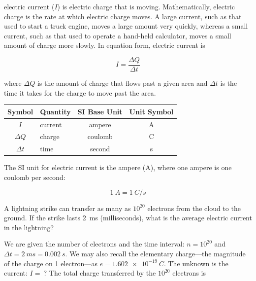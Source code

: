 \documentclass[dvipsnames]{article}
\numberwithin{equation}{section}
\numberwithin{figure}{section}
\begin{document}
\Gls{electric current} ($I$) is electric charge that is moving. Mathematically, electric charge is the rate at which electric charge moves. A large current, such as that used to start a truck engine, moves a large amount very quickly, whereas a small current, such as that used to operate a hand-held calculator, moves a small amount of charge more slowly. In equation form, electric current is

\begin{equation} \label{JzFlJp}
    I = \frac{\Delta Q}{\Delta t}
\end{equation}

where $\Delta{Q}$ is the amount of charge that flows past a given area and $\Delta{t}$ is the time it takes for the charge to move past the area.

\begin{center}
    \begin{tabular}{cl|cc}
    \hline
    \textbf{Symbol} & \textbf{Quantity} & \textbf{SI Base Unit} & \textbf{Unit Symbol}  \\
    \hline\hline
    \rule{0pt}{2.5ex}
        $I$ & current & ampere & A\\
        $\Delta{Q}$ & charge & coulomb & C\\
        $\Delta{t}$ & time & second & s\\
    \hline
    \end{tabular}
\end{center}

 The SI unit for electric current is the \gls{ampere} (A), where one ampere is one coulomb per second:

\begin{equation}
    \SI{1}{A} = \SI{1}{C/s}
\end{equation}

\clearpage

\begin{example}
    A lightning strike can transfer as many as $10^{20}$ electrons from the cloud to the ground. If the strike lasts \SI{2}{ms} (milliseconds), what is the average electric current in the lightning?
\end{example}

\Solution We are given the number of electrons and the time interval: $n = 10^{20}$ and $\Delta t = \SI{2}{ms} = \SI{0.002}{s}$. We may also recall the elementary charge---the magnitude of the charge on 1 electron---as $e = \SI{1.602e-19}{C}$. The unknown is the current: $I =\ ?$ The total charge transferred by the $10^{20}$ electrons is
\end{document}
